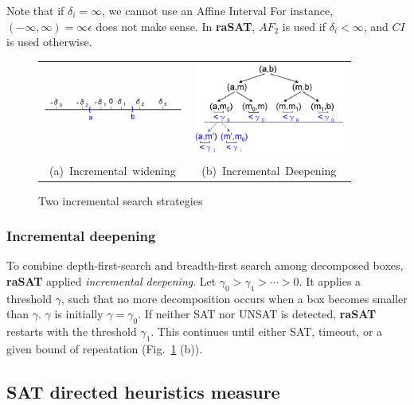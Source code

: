 \documentclass[runningheads,a4paper,oribibl]{llncs}
\begin{document}
Note that if $\delta_i = \infty$, we cannot use an Affine Interval
For instance, $(-\infty,\infty) = \infty \epsilon$ does not make sense.
In {\bf raSAT}, $AF_2$ is used if $\delta_i < \infty$, and $CI$ is used otherwise.
\begin{figure}[ht]
\begin{minipage}[b]{1.0\linewidth}
\centering
\begin{tabular}{c@{\qquad}c}
\includegraphics[height=0.4in,width=1.8in]{IncWiden.png} &
\includegraphics[height=1.2in,width=2in]{IncDeepen.png} \\
\mbox{(a) Incremental widening} & \mbox{(b) Incremental Deepening} \\
\end{tabular}
\caption{Two incremental search strategies}
\label{fig:incwid}
\end{minipage}
\end{figure}


\subsubsection*{Incremental deepening}

To combine depth-first-search and breadth-first search among decomposed boxes,
{\bf raSAT} applied {\em incremental deepening}. 
Let $\gamma_0 > \gamma_1 > \cdots > 0$. 
It applies a threshold $\gamma$, such that no more decomposition occurs 
when a box becomes smaller than $\gamma$.
$\gamma$ is initially $\gamma=\gamma_0$. 
If neither SAT nor UNSAT is detected, {\bf raSAT} restarts with the threshold $\gamma_1$.
This continues until either SAT, timeout, or
a given bound of repeatation (Fig.~\ref{fig:incwid} (b)). 


\subsection{SAT directed heuristics measure} \label{sec:SATheuristics}
\end{document}
